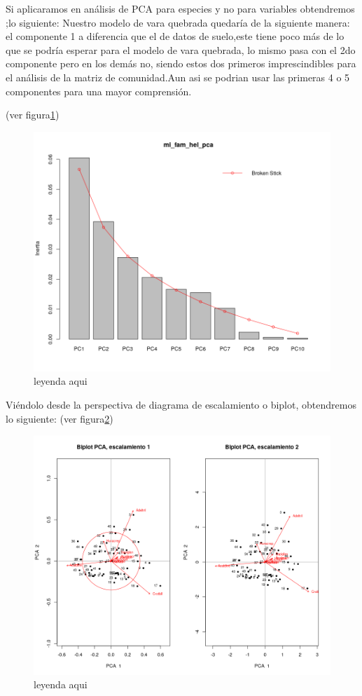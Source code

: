 \documentclass[11pt,]{article}
\begin{document}
Si aplicaramos en análisis de PCA para especies y no para variables
obtendremos ;lo siguiente: Nuestro modelo de vara quebrada quedaría de
la siguiente manera: el componente 1 a diferencia que el de datos de
suelo,este tiene poco más de lo que se podría esperar para el modelo de
vara quebrada, lo mismo pasa con el 2do componente pero en los demás no,
siendo estos dos primeros imprescindibles para el análisis de la matriz
de comunidad.Aun asi se podrian usar las primeras 4 o 5 componentes para
una mayor comprensión.

(ver figura\ref{fig:quebrada_especie})

\begin{figure}
\centering
\includegraphics{quebrada_especie.png}
\caption{\label{fig:quebrada_especie}leyenda aqui}
\end{figure}

Viéndolo desde la perspectiva de diagrama de escalamiento o biplot,
obtendremos lo siguiente: (ver figura\ref{fig:biplot_especie})

\begin{figure}
\centering
\includegraphics{biplot_especie.png}
\caption{\label{fig:biplot_especie}leyenda aqui}
\end{figure}
\end{document}
